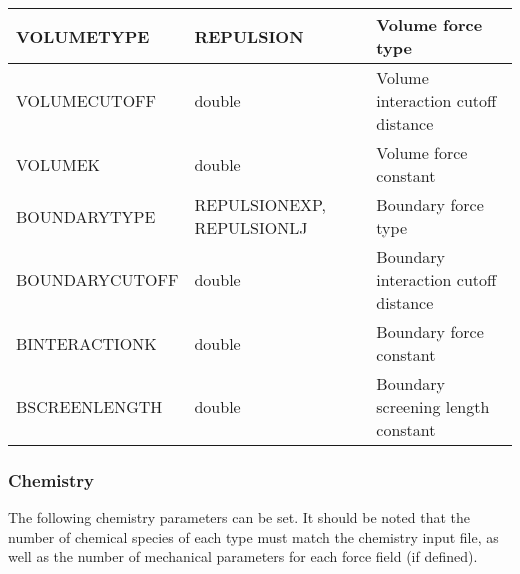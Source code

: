 \documentclass[11pt, oneside]{article}   	%
\begin{document}
\begin{table} [!ht]
\begin{tabular}{|L{5cm}|C{4cm}|L{7cm}|}
  \hline
   VOLUMETYPE & REPULSION & Volume force type \\
  \hline
   VOLUMECUTOFF & double & Volume interaction cutoff distance\\
  \hline
  VOLUMEK & double & Volume force constant \\
  \hline
  BOUNDARYTYPE & REPULSIONEXP, REPULSIONLJ & Boundary force type \\
  \hline
   BOUNDARYCUTOFF & double & Boundary interaction cutoff distance\\
  \hline
  BINTERACTIONK & double & Boundary force constant \\
  \hline
  BSCREENLENGTH & double & Boundary screening length constant\\
  \hline
 
 \end{tabular}
\end{table}

\break
\subsubsection{Chemistry}

The following chemistry parameters can be set. It should be noted that the number of chemical species of each type must match the chemistry input file, as well as the number of mechanical parameters for each force field (if defined).
\end{document}
